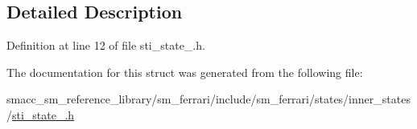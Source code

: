 \subsection{Detailed Description}


Definition at line 12 of file sti\+\_\+state\+\_.\+h.



The documentation for this struct was generated from the following file\+:\begin{DoxyCompactItemize}
\item 
smacc\+\_\+sm\+\_\+reference\+\_\+library/sm\+\_\+ferrari/include/sm\+\_\+ferrari/states/inner\+\_\+states/\hyperlink{sm__ferrari_2include_2sm__ferrari_2states_2inner__states_2sti__state__3_8h}{sti\+\_\+state\+\_.\+h}\end{DoxyCompactItemize}
